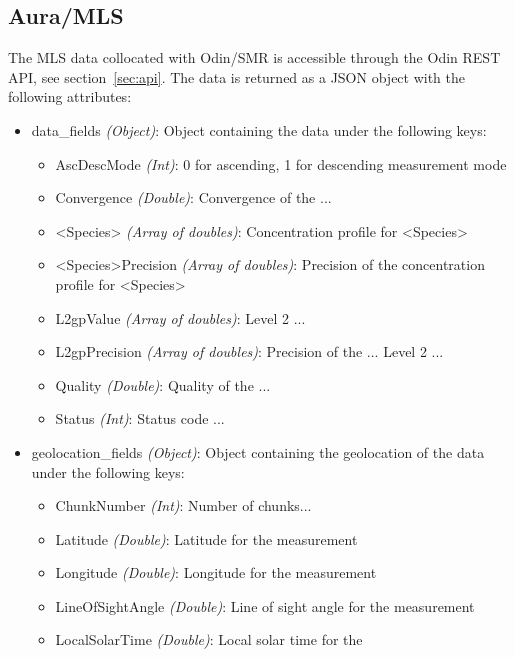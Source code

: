 \subsection{Aura/MLS}
The MLS data collocated with Odin/SMR is accessible through the Odin REST
API, see section~\ref{sec:api}. The data is returned as a JSON object with the
following attributes:
\begin{itemize}
    \item data\_fields \emph{(Object)}: Object containing the data under the
        following keys:
        \begin{itemize}
            \item AscDescMode \emph{(Int)}: 0 for ascending, 1 for descending
                measurement mode
            \item Convergence \emph{(Double)}: Convergence of the ...
            \item <Species> \emph{(Array of doubles)}: Concentration profile
                for <Species>
            \item <Species>Precision \emph{(Array of doubles)}: Precision of
                the concentration profile for <Species>
            \item L2gpValue \emph{(Array of doubles)}: Level 2 ... 
            \item L2gpPrecision \emph{(Array of doubles)}: Precision of the ...
                Level 2 ... 
            \item Quality \emph{(Double)}: Quality of the ... 
            \item Status \emph{(Int)}: Status code ...
        \end{itemize}
    \item geolocation\_fields \emph{(Object)}: Object containing the
        geolocation of the data under the following keys:
        \begin{itemize}
            \item ChunkNumber \emph{(Int)}: Number of chunks...
            \item Latitude \emph{(Double)}: Latitude for the measurement
            \item Longitude \emph{(Double)}: Longitude for the measurement
            \item LineOfSightAngle \emph{(Double)}: Line of sight angle for the
                measurement
            \item LocalSolarTime \emph{(Double)}: Local solar time for the

\end{itemize}
\end{itemize}
